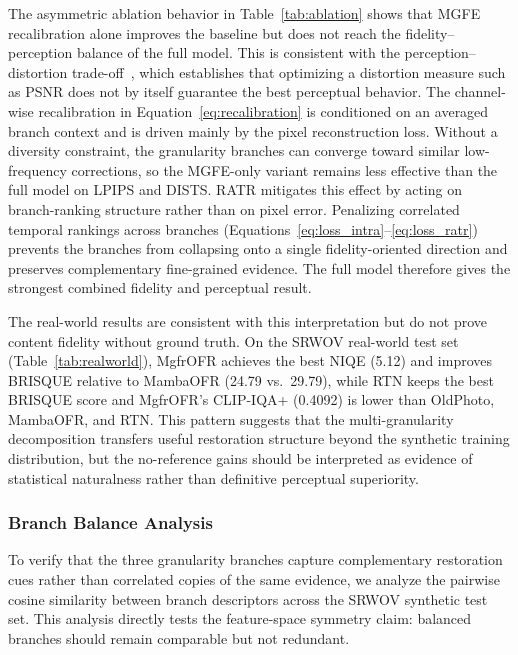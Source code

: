 The asymmetric ablation behavior in Table~\ref{tab:ablation} shows that MGFE recalibration alone improves the baseline but does not reach the fidelity--perception balance of the full model. This is consistent with the perception--distortion trade-off~\cite{blau2018perception}, which establishes that optimizing a distortion measure such as PSNR does not by itself guarantee the best perceptual behavior. The channel-wise recalibration in Equation~\eqref{eq:recalibration} is conditioned on an averaged branch context and is driven mainly by the pixel reconstruction loss. Without a diversity constraint, the granularity branches can converge toward similar low-frequency corrections, so the MGFE-only variant remains less effective than the full model on LPIPS and DISTS. RATR mitigates this effect by acting on branch-ranking structure rather than on pixel error. Penalizing correlated temporal rankings across branches (Equations~\eqref{eq:loss_intra}--\eqref{eq:loss_ratr}) prevents the branches from collapsing onto a single fidelity-oriented direction and preserves complementary fine-grained evidence. The full model therefore gives the strongest combined fidelity and perceptual result.

The real-world results are consistent with this interpretation but do not prove content fidelity without ground truth. On the SRWOV real-world test set (Table~\ref{tab:realworld}), MgfrOFR achieves the best NIQE (5.12) and improves BRISQUE relative to MambaOFR (24.79 vs.\ 29.79), while RTN keeps the best BRISQUE score and MgfrOFR's CLIP-IQA+ (0.4092) is lower than OldPhoto, MambaOFR, and RTN. This pattern suggests that the multi-granularity decomposition transfers useful restoration structure beyond the synthetic training distribution, but the no-reference gains should be interpreted as evidence of statistical naturalness rather than definitive perceptual superiority.

\subsubsection{Branch Balance Analysis}
\label{subsec:branch_analysis}

To verify that the three granularity branches capture complementary restoration cues rather than correlated copies of the same evidence, we analyze the pairwise cosine similarity between branch descriptors across the SRWOV synthetic test set. This analysis directly tests the feature-space symmetry claim: balanced branches should remain comparable but not redundant.

